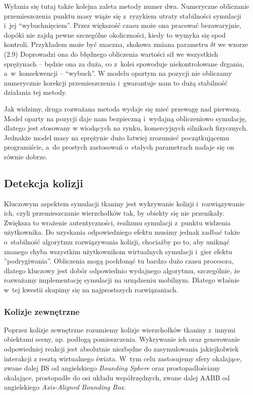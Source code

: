 			Wyłania się tutaj także kolejna zaleta metody numer dwa. Numeryczne obliczanie przemieszczenia punktu masy wiąże się z~ryzykiem utraty stabilności symulacji i~jej ``wybuchnięciem''. Przez większość czasu może ona pracować bezawaryjnie, dopóki nie zajdą pewne szczególne okoliczności, kiedy to wymyka się spod kontroli. Przykładem może być znaczna, skokowa zmiana parametru \( \delta t \) we wzorze (2.9) Doprowadzi ona do błędnego obliczenia wartości sił we wszystkich sprężynach -- będzie ona za duża, co z~kolei spowoduje niekontrolowane drgania, a~w~konsekwencji -- ``wybuch''. W modelu opartym na pozycji nie obliczamy numerycznie korekcji przemieszczenia i~gwarantuje nam to dużą stabilność działania tej metody.
			
			Jak widzimy, druga rozważana metoda wydaje się mieć przewagę nad pierwszą. Model oparty na pozycji daje nam bezpieczną i~wydajną obliczeniowo symulację, dlatego jest stosowany w wiodących na rynku, komercyjnych silnikach fizycznych. Jednakże model masy na sprężynie dużo łatwiej zrozumieć początkującemu programiście, a~do prostych zastosowań o~stałych parametrach nadaje się on równie dobrze.
		
		\subsection{Detekcja kolizji}
		\label{t:teoria:analiza:kolizje}
		
			Kluczowym aspektem symulacji tkaniny jest wykrywanie kolizji i~rozwiązywanie ich, czyli przemieszczanie wierzchołków tak, by obiekty się nie przenikały. Zwiększa to wrażenie autentyczności, realizmu symulacji z~punktu widzenia użytkownika. Do uzyskania odpowiedniego efektu musimy jednak zadbać także o~stabilność algorytmu rozwiązywania kolizji, chociażby po to, aby uniknąć znanego chyba wszystkim użytkownikom wirtualnych symulacji i~gier efektu ''podrygiwania''. Obliczenia mogą pochłonąć tu bardzo dużo czasu procesora, dlatego kluczowy jest dobór odpowiednio wydajnego algorytmu, szczególnie, że rozważamy implementację symulacji na urządzeniu mobilnym. Dlatego właśnie w~tej kwestii skupimy się na najprostszych rozwiązaniach.
		
			\subsubsection{Kolizje zewnętrzne}
			\label{t:teoria:analiza:kolizje:zewn}
			
				Poprzez kolizje zewnętrzne rozumiemy kolizje wierzchołków tkaniny z~innymi obiektami sceny, np. podłogą pomieszczenia. Wykrywanie ich oraz generowanie odpowiedniej reakcji jest absolutnie niezbędne do zasymulowania jakiejkolwiek interakcji z resztą wirtualnego świata. W~tym celu zastosujemy sfery okalające, zwane dalej BS od angielskiego \emph{Bounding Sphere} oraz prostopadłościany okalające, prostopadłe do osi układu współrzędnych, zwane dalej AABB od angielskiego \emph{Axis-Aligned Bounding Box}.
				
